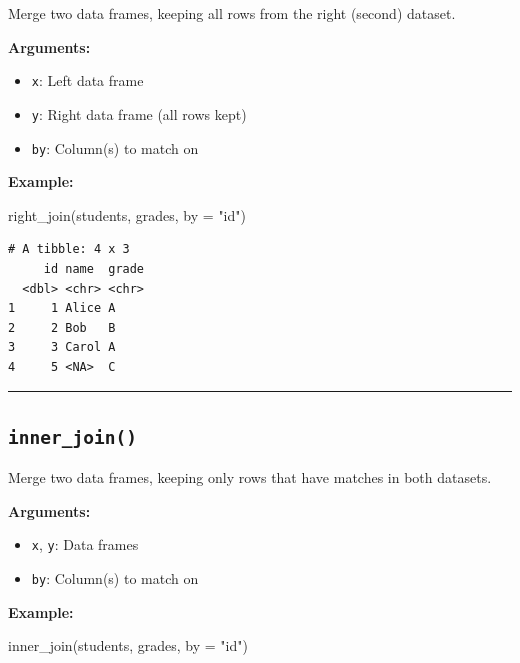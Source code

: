 \documentclass[
  letterpaper,
  DIV=11,
  numbers=noendperiod]{scrreprt}
\newenvironment{Shaded}{\begin{snugshade}}{\end{snugshade}}
\newcommand{\AttributeTok}[1]{\textcolor[rgb]{0.40,0.45,0.13}{#1}}
\newcommand{\FunctionTok}[1]{\textcolor[rgb]{0.28,0.35,0.67}{#1}}
\newcommand{\NormalTok}[1]{\textcolor[rgb]{0.00,0.23,0.31}{#1}}
\newcommand{\StringTok}[1]{\textcolor[rgb]{0.13,0.47,0.30}{#1}}
\providecommand{\tightlist}{%
  \setlength{\itemsep}{0pt}\setlength{\parskip}{0pt}}
\begin{document}
Merge two data frames, keeping all rows from the right (second) dataset.

\textbf{Arguments:}

\begin{itemize}
\tightlist
\item
  \texttt{x}: Left data frame
\item
  \texttt{y}: Right data frame (all rows kept)
\item
  \texttt{by}: Column(s) to match on
\end{itemize}

\textbf{Example:}

\begin{Shaded}
\begin{Highlighting}[]
\FunctionTok{right\_join}\NormalTok{(students, grades, }\AttributeTok{by =} \StringTok{"id"}\NormalTok{)}
\end{Highlighting}
\end{Shaded}

\begin{verbatim}
# A tibble: 4 x 3
     id name  grade
  <dbl> <chr> <chr>
1     1 Alice A    
2     2 Bob   B    
3     3 Carol A    
4     5 <NA>  C    
\end{verbatim}

\begin{center}\rule{0.5\linewidth}{0.5pt}\end{center}

\subsection{\texorpdfstring{\texttt{inner\_join()}}{inner\_join()}}\label{inner_join-1}

Merge two data frames, keeping only rows that have matches in both
datasets.

\textbf{Arguments:}

\begin{itemize}
\tightlist
\item
  \texttt{x}, \texttt{y}: Data frames
\item
  \texttt{by}: Column(s) to match on
\end{itemize}

\textbf{Example:}

\begin{Shaded}
\begin{Highlighting}[]
\FunctionTok{inner\_join}\NormalTok{(students, grades, }\AttributeTok{by =} \StringTok{"id"}\NormalTok{)}
\end{Highlighting}
\end{Shaded}
\end{document}
